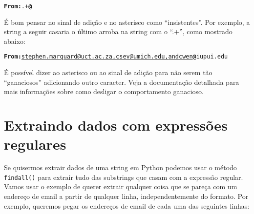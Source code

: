 \beforeverb
\begin{alltt}
{\bf From:}\underline{.+}{\bf @}
\end{alltt}
\afterverb

É bom pensar no sinal de adição e no asterisco como ``insistentes''. Por exemplo, a string a seguir
casaria o último arroba na string com o ``.+'', como mostrado abaixo:

\beforeverb
\begin{alltt}
{\bf From:}\underline{ stephen.marquard@uct.ac.za, csev@umich.edu, and cwen}{\bf @}iupui.edu
\end{alltt}
\afterverb

É possível dizer ao asterisco ou ao sinal de adição para não serem tão ``ganaciosos'' 
adicionando outro caracter. Veja a documentação detalhada para mais informações sobre 
como desligar o comportamento ganacioso.


\section{Extraindo dados com expressões regulares}

Se quisermos extrair dados de uma string em Python podemos usar o método {\tt findall()} para extrair
tudo das substrings que casam com a expressão regular. Vamos usar o exemplo de querer extrair qualquer 
coisa que se pareça com um endereço de email a partir de qualquer linha, independentemente do formato.
Por exemplo, queremos pegar os endereços de email de cada uma das seguintes linhas: 

